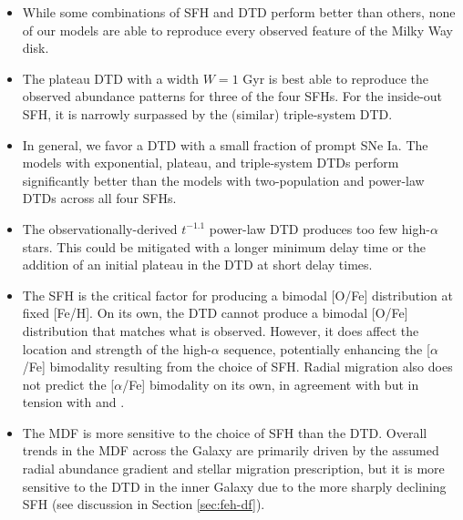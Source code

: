 \documentclass[twocolumn,twocolappendix,linenumbers]{aastex631}
\newcommand{\aFe}{[$\alpha$/Fe]\xspace}
\begin{document}
\begin{itemize}
    \item While some combinations of SFH and DTD perform better than others, none of our models are able to reproduce every observed feature of the Milky Way disk.
    
    \item The plateau DTD with a width $W=1$ Gyr is best able to reproduce the observed abundance patterns for three of the four SFHs. For the inside-out SFH, it is narrowly surpassed by the (similar) triple-system DTD.

    \item In general, we favor a DTD with a small fraction of prompt SNe Ia. The models with exponential, plateau, and triple-system DTDs perform significantly better than the models with two-population and power-law DTDs across all four SFHs.

    \item The observationally-derived $t^{-1.1}$ power-law DTD produces too few high-$\alpha$ stars. This could be mitigated with a longer minimum delay time or the addition of an initial plateau in the DTD at short delay times.
    
    \item The SFH is the critical factor for producing a bimodal [O/Fe] distribution at fixed [Fe/H]. On its own, the DTD cannot produce a bimodal [O/Fe] distribution that matches what is observed. However, it does affect the location and strength of the high-$\alpha$ sequence, potentially enhancing the \aFe bimodality resulting from the choice of SFH. Radial migration also does not predict the \aFe bimodality on its own, in agreement with  but in tension with \citep{Sharma2021-RadialMigration} and \citep{Chen2023-RadialMixingRedux}.

    \item The MDF is more sensitive to the choice of SFH than the DTD. Overall trends in the MDF across the Galaxy are primarily driven by the assumed radial abundance gradient and stellar migration prescription, but it is more sensitive to the DTD in the inner Galaxy due to the more sharply declining SFH (see discussion in Section \ref{sec:feh-df}).

\end{itemize}
\end{document}
